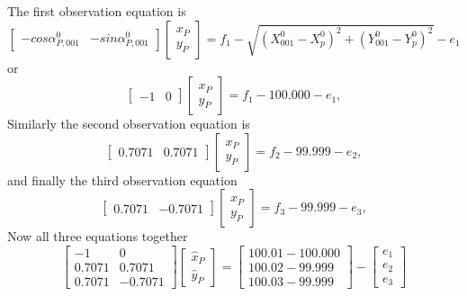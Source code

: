 \par
The first observation equation is
\begin{equation*}
	\begin{bmatrix}
		- cos{\alpha_{P,001}^{0}} & - sin{\alpha_{P,001}^{0}}
	\end{bmatrix}
	\begin{bmatrix}
		x_P \\ y_P
	\end{bmatrix}
	= f_1 - \sqrt{(X_{001}^{0} - X_{p}^{0})^2 + (Y_{001}^{0} - Y_{p}^{0})^2} - e_1
\end{equation*}
or
\begin{equation*}
	\begin{bmatrix}
		-1 & 0
	\end{bmatrix}
	\begin{bmatrix}
		x_P \\ y_P
	\end{bmatrix}
	= f_1 - 100.000 - e_1,
\end{equation*}
Similarly the second observation equation is
\begin{equation*}
	\begin{bmatrix}
		0.707 1 & 0.7071
	\end{bmatrix}
	\begin{bmatrix}
		x_P \\ y_P
	\end{bmatrix}
	= f_2 - 99.999 - e_2,
\end{equation*}
and finally the third observation equation
\begin{equation*}
	\begin{bmatrix}
		0.707 1 & -0.7071
	\end{bmatrix}
	\begin{bmatrix}
		x_P \\ y_P
	\end{bmatrix}
	= f_3 - 99.999 - e_3,
\end{equation*}
Now all three equations together
\begin{equation*}
	\begin{bmatrix}
		-1 & 0\\
		0.707 1 & 0.7071\\
		0.707 1 & -0.7071
	\end{bmatrix}
	\begin{bmatrix}
		\hat{x}_P \\ \hat{y}_P
	\end{bmatrix}
	= \begin{bmatrix}
		100.01- 100.000\\
		100.02- 99.999\\
		100.03- 99.999
	\end{bmatrix}
	-
	\begin{bmatrix}
		e_1\\
		e_2\\
		e_3
	\end{bmatrix}
\end{equation*}
